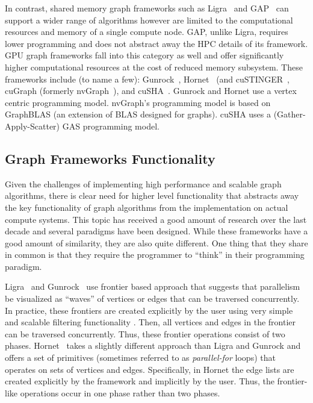 In contrast, shared memory graph frameworks such as Ligra~\cite{shun2013ligra} and GAP~\cite{beamer2015gap} can support a wider range of algorithms however are limited to the computational resources and memory of a single compute node. GAP, unlike Ligra, requires lower programming and does not abstract away the HPC details of its framework.
GPU graph frameworks fall into this category as well and offer significantly higher computational resources at the cost of reduced memory subsystem.
These frameworks include (to name a few): Gunrock~\cite{wang2017gunrock}, Hornet~\cite{green-hornet} (and cuSTINGER~\cite{DBLP:conf/hpec/GreenB16}, cuGraph (formerly nvGraph~\cite{nvGraph}), and cuSHA~\cite{cusha}.
Gunrock and Hornet use a vertex centric programming model. nvGraph's programming model is based on GraphBLAS (an extension of BLAS designed for graphs). cuSHA uses a (Gather-Apply-Scatter) GAS programming model.

\subsection{Graph Frameworks Functionality}

Given the challenges of implementing high performance and scalable graph algorithms, there is clear need for higher level functionality that abstracts away the key functionality of graph algorithms from the implementation on actual compute systems. This topic has received a good amount of research over the last decade and several paradigms have been designed. While these frameworks have a good amount of similarity, they are also quite different. One thing that they share in common is that they require the programmer to ``think'' in their programming paradigm.


Ligra~\cite{shun2013ligra} and Gunrock~\cite{wang2017gunrock} use frontier based approach that suggests that parallelism be visualized as ``waves'' of vertices or edges that can be traversed concurrently. In practice, these frontiers are created explicitly by the user using very simple and scalable filtering functionality . Then, all vertices and edges in the frontier can be traversed concurrently. Thus, these frontier operations consist of two phases. Hornet~\cite{green-hornet} takes a slightly different approach than Ligra and Gunrock and offers a set of primitives (sometimes referred to as \emph{parallel-for} loops) that operates on sets of vertices and edges. Specifically, in Hornet the edge lists are created explicitly by the framework and implicitly by the user. Thus, the frontier-like operations occur in one phase rather than two phases.


